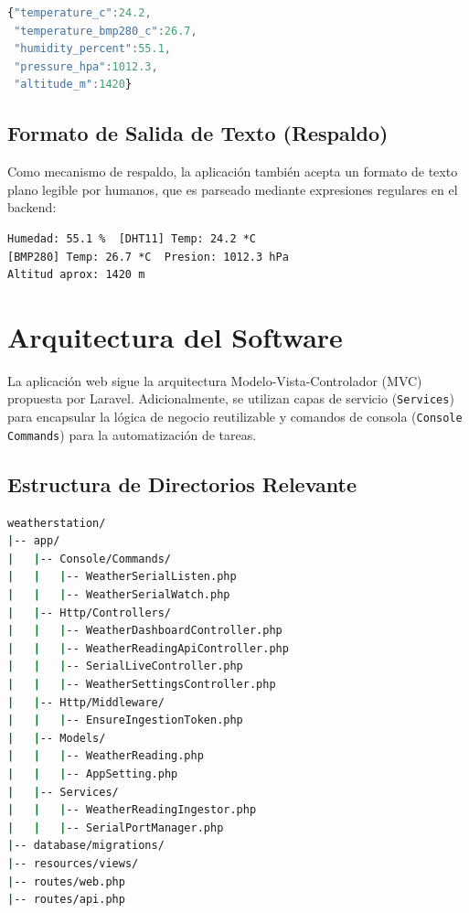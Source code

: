 \documentclass[12pt,a4paper]{report}
\begin{document}
\begin{lstlisting}[language=JavaScript, caption={Ejemplo de trama JSON enviada por el Arduino.}]
{"temperature_c":24.2,
 "temperature_bmp280_c":26.7,
 "humidity_percent":55.1,
 "pressure_hpa":1012.3,
 "altitude_m":1420}
\end{lstlisting}

\subsection{Formato de Salida de Texto (Respaldo)}
\label{subsec:formato-texto}

Como mecanismo de respaldo, la aplicación también acepta un formato de texto plano legible por humanos, que es parseado mediante expresiones regulares en el backend:

\begin{lstlisting}[caption={Ejemplo de trama de texto aceptada.}]
Humedad: 55.1 %  [DHT11] Temp: 24.2 *C
[BMP280] Temp: 26.7 *C  Presion: 1012.3 hPa
Altitud aprox: 1420 m
\end{lstlisting}

\section{Arquitectura del Software}
\label{sec:arquitectura}

La aplicación web sigue la arquitectura Modelo-Vista-Controlador (MVC) propuesta por Laravel. Adicionalmente, se utilizan capas de servicio (\texttt{Services}) para encapsular la lógica de negocio reutilizable y comandos de consola (\texttt{Console Commands}) para la automatización de tareas.

\subsection{Estructura de Directorios Relevante}
\label{subsec:estructura}

\begin{lstlisting}[language=bash, caption={Estructura simplificada del proyecto.}]
weatherstation/
|-- app/
|   |-- Console/Commands/
|   |   |-- WeatherSerialListen.php
|   |   |-- WeatherSerialWatch.php
|   |-- Http/Controllers/
|   |   |-- WeatherDashboardController.php
|   |   |-- WeatherReadingApiController.php
|   |   |-- SerialLiveController.php
|   |   |-- WeatherSettingsController.php
|   |-- Http/Middleware/
|   |   |-- EnsureIngestionToken.php
|   |-- Models/
|   |   |-- WeatherReading.php
|   |   |-- AppSetting.php
|   |-- Services/
|   |   |-- WeatherReadingIngestor.php
|   |   |-- SerialPortManager.php
|-- database/migrations/
|-- resources/views/
|-- routes/web.php
|-- routes/api.php
\end{lstlisting}
\end{document}
